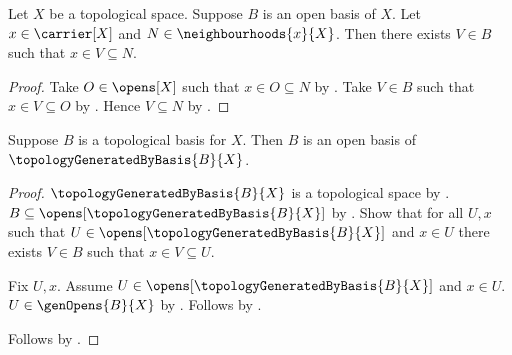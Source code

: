 \begin{proposition}\label{open_basis_refines_neighbourhood}
    Let $X$ be a topological space.
    Suppose $B$ is an open basis of $X$.
    Let $x\in\carrier[X]$ and $N\in\neighbourhoods{x}{X}$.
    Then there exists $V\in B$ such that $x\in V\subseteq N$.
\end{proposition}
\begin{proof}
    Take $O\in\opens[X]$ such that $x\in O\subseteq N$ by
        .
    Take $V\in B$ such that $x\in V\subseteq O$ by
        .
    Hence $V\subseteq N$ by .
\end{proof}

\begin{theorem}\label{topology_generated_by_basis_has_open_basis}
    Suppose $B$ is a topological basis for $X$.
    Then $B$ is an open basis of $\topologyGeneratedByBasis{B}{X}$.
\end{theorem}
\begin{proof}
    $\topologyGeneratedByBasis{B}{X}$ is a topological space
        by .
    $B\subseteq\opens[\topologyGeneratedByBasis{B}{X}]$
        by
        .
    Show that for all $U,x$ such that
        $U\in\opens[\topologyGeneratedByBasis{B}{X}]$ and $x\in U$
        there exists $V\in B$ such that
            $x\in V\subseteq U$.
    \begin{subproof}
        Fix $U,x$.
        Assume $U\in\opens[\topologyGeneratedByBasis{B}{X}]$ and $x\in U$.
        $U\in\genOpens{B}{X}$
            by .
        Follows by .
    \end{subproof}
    Follows by .
\end{proof}

